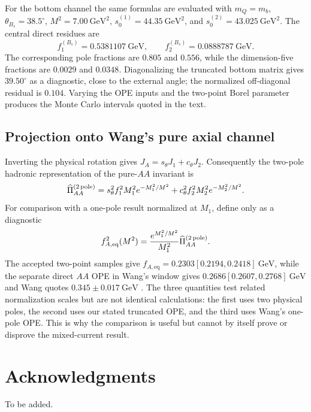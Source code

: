 \documentclass[11pt]{article}
\newcommand{\GeV}{\mathrm{GeV}}
\begin{document}
For the bottom channel the same formulas are evaluated with $m_Q=m_b$,
$\theta_{B_s}=38.5^\circ$, $M^2=7.00~\GeV^2$,
$s_0^{(1)}=44.35~\GeV^2$, and
$s_0^{(2)}=43.025~\GeV^2$.  The central direct residues are
\begin{equation}
 f_1^{(B_s)}=0.5381107~\GeV,\qquad
 f_2^{(B_s)}=0.0888787~\GeV .
\end{equation}
The corresponding pole fractions are $0.805$ and $0.556$, while the
dimension-five fractions are $0.0029$ and $0.0348$.  Diagonalizing the
truncated bottom matrix gives $39.50^\circ$ as a diagnostic, close to the
external angle; the normalized off-diagonal residual is $0.104$.  Varying the
OPE inputs and the two-point Borel parameter produces the Monte Carlo
intervals quoted in the text.

\subsection{Projection onto Wang's pure axial channel}

Inverting the physical rotation gives $J_A=s_\theta J_1+c_\theta J_2$.
Consequently the two-pole hadronic representation of the pure-$AA$ invariant is
\begin{equation}
 \widehat\Pi_{AA}^{(2\,{\rm pole})}
 =s_\theta^2 f_1^2M_1^2e^{-M_1^2/M^2}
 +c_\theta^2 f_2^2M_2^2e^{-M_2^2/M^2}.
 \label{eq:app-aa-two-pole}
\end{equation}
For comparison with a one-pole result normalized at $M_1$, define only as a
diagnostic
\begin{equation}
 f_{A,\mathrm{eq}}^2(M^2)=
 \frac{e^{M_1^2/M^2}}{M_1^2}
 \widehat\Pi_{AA}^{(2\,{\rm pole})}.
 \label{eq:app-wang-projection}
\end{equation}
The accepted two-point samples give
$f_{A,\mathrm{eq}}=0.2303[0.2194,0.2418]~\GeV$, while the separate direct
$AA$ OPE in Wang's window gives
$0.2686[0.2607,0.2768]~\GeV$ and Wang quotes
$0.345\pm0.017~\GeV$ \cite{Wang2015}.  The three quantities test related
normalization scales but are not identical calculations: the first uses two
physical poles, the second uses our stated truncated OPE, and the third uses
Wang's one-pole OPE.  This is why the comparison is useful but cannot by itself
prove or disprove the mixed-current result.

\section*{Acknowledgments}

To be added.



\end{document}
